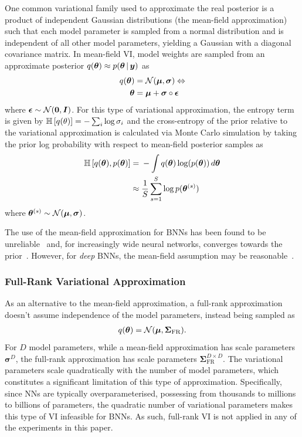 \documentclass[10pt,a4paper,twocolumn]{article}
\begin{document}
One common variational family used to approximate the real posterior is a product of independent Gaussian distributions (the mean-field approximation) such that each model parameter is sampled from a normal distribution and is independent of all other model parameters, yielding a Gaussian with a diagonal covariance matrix.
In mean-field VI, model weights are sampled from an approximate posterior \(q(\bm \theta) \approx p(\bm{\theta} \, | \, \bm y)\) as
\begin{align}
    q(\bm \theta) ={} & \mathcal{N}(\bm \mu, \bm \sigma) \Leftrightarrow \nonumber         \\
    \bm{\theta} ={}   & \bm{\mu} + \bm{\sigma} \circ \bm{\epsilon}\label{eq:meanfield}
\end{align}
where \(\bm{\epsilon} \sim \mathcal{N}(\bm 0, \bm{I})\).
For this type of variational approximation, the entropy term is given by \(\mathbb{H}\left[q(\theta)\right] = - \sum_i \log \sigma_i\) and the cross-entropy of the prior relative to the variational approximation is calculated via Monte Carlo simulation by taking the prior log probability with respect to mean-field posterior samples as
\begin{align}
    \mathbb{H}\left[q(\bm\theta), p(\bm\theta)\right] ={} & - \int q(\bm\theta) \log(p(\bm\theta))\,d\bm\theta \nonumber \\
    \approx{}                                     & \frac{1}{S} \sum^S_{s=1} \log p(\bm{\theta}^{(s)})
\end{align}
where \(\bm{\theta}^{(s)} \sim \mathcal{N}(\bm{\mu}, \bm{\sigma})\).

The use of the mean-field approximation for BNNs has been found to be unreliable~\cite{wu2018deterministic} and, for increasingly wide neural networks, converges towards the prior~\cite{coker2021wide}.
However, for \emph{deep} BNNs, the mean-field assumption may be reasonable~\cite{farquhar2020liberty}.

\subsubsection{Full-Rank Variational Approximation}

As an alternative to the mean-field approximation, a full-rank approximation doesn't assume independence of the model parameters, instead being sampled as
\begin{align}\label{eq:fullrank}
    q(\bm \theta) = \mathcal{N}(\bm \mu, \bm \Sigma_{\mathrm{FR}}).
\end{align}
For \(D\) model parameters, while a mean-field approximation has scale parameters \(\bm \sigma^D\), the full-rank approximation has scale parameters \(\bm \Sigma_{\mathrm{FR}}^{D \times D}\).
The variational parameters scale quadratically with the number of model parameters, which constitutes a significant limitation of this type of approximation.
Specifically, since NNs are typically overparameterised, possessing from thousands to millions to billions of parameters, the quadratic number of variational parameters makes this type of VI infeasible for BNNs.
As such, full-rank VI is not applied in any of the experiments in this paper.
\end{document}
